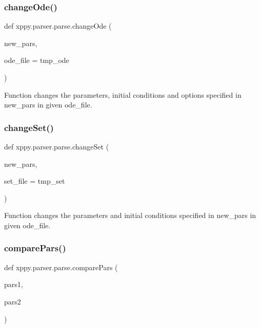 \subsubsection{\texorpdfstring{change\+Ode()}{changeOde()}}
{\footnotesize\ttfamily def xppy.\+parser.\+parse.\+change\+Ode (\begin{DoxyParamCaption}\item[{}]{new\+\_\+pars,  }\item[{}]{ode\+\_\+file = {\ttfamily tmp\+\_\+ode} }\end{DoxyParamCaption})}

\begin{DoxyVerb}Function changes the parameters, initial conditions and options specified in
new_pars in given ode_file. 
\end{DoxyVerb}
 \mbox{\label{namespacexppy_1_1parser_1_1parse_af04c5b3924cc737b63d6266edc3642aa}} 
\subsubsection{\texorpdfstring{change\+Set()}{changeSet()}}
{\footnotesize\ttfamily def xppy.\+parser.\+parse.\+change\+Set (\begin{DoxyParamCaption}\item[{}]{new\+\_\+pars,  }\item[{}]{set\+\_\+file = {\ttfamily tmp\+\_\+set} }\end{DoxyParamCaption})}

\begin{DoxyVerb}Function changes the parameters and initial conditions specified in
new_pars in given ode_file. 
\end{DoxyVerb}
 \mbox{\label{namespacexppy_1_1parser_1_1parse_a14842f4006ba1a6ccd66af9b43857426}} 
\subsubsection{\texorpdfstring{compare\+Pars()}{comparePars()}}
{\footnotesize\ttfamily def xppy.\+parser.\+parse.\+compare\+Pars (\begin{DoxyParamCaption}\item[{}]{pars1,  }\item[{}]{pars2 }\end{DoxyParamCaption})}


